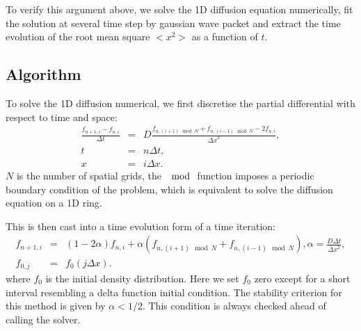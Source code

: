 \documentclass[a4paper,12pt]{article}
\begin{document}
To verify this argument above, we solve the 1D diffusion equation numerically, fit the solution at several time step by gaussian wave packet and extract the time evolution of the root mean square $<x^2>$ as a function of $t$.

\subsection{Algorithm}
To solve the 1D diffusion numerical, we first discretise the partial differential with respect to time and space:
\begin{eqnarray*}
\frac{f_{n+1,i}-f_{n,i}}{\Delta t}  &=& D\frac{f_{n,(i+1)\mod N}+f_{n,(i-1)\mod N} - 2 f_{n,i}}{{\Delta x}^2},\\
t &=& n \Delta t, \\
x &=& i \Delta x.
\end{eqnarray*}
$N$ is the number of spatial grids, the $\mod$ function imposes a periodic boundary condition of the problem, which is equivalent to solve the diffusion equation on a 1D ring.

This is then cast into a time evolution form of a time iteration:
\begin{eqnarray*}
f_{n+1,i} &=&  (1 - 2 \alpha) f_{n,i} + \alpha (f_{n, (i+1)\mod N}+f_{n, (i-1)\mod N}), \alpha = \frac{D\Delta t}{{\Delta x}^2},\\
f_{0,j} &=& f_0(j\Delta x).
\end{eqnarray*}
where $f_0$ is the initial density distribution. Here we set $f_0$ zero except for a short interval resembling a delta function initial condition. The stability criterion for this method is given by $\alpha < 1/2$. This condition is always checked ahead of calling the solver. 
\end{document}
